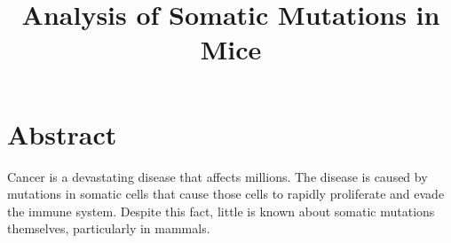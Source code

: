 \documentclass[12pt]{article}
\title{Analysis of Somatic Mutations in Mice}
\date{}
\begin{document}
\maketitle





\section{Abstract}

Cancer is a devastating disease that affects millions. The disease is caused by mutations in somatic cells that cause those cells to rapidly proliferate and evade the immune system. Despite this fact, little is known about somatic mutations themselves, particularly in mammals. 
\end{document}
